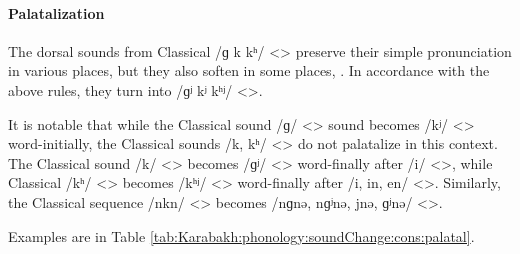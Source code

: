 \paragraph{Palatalization} 

The dorsal sounds from Classical /ɡ k kʰ/ <> preserve their simple pronunciation in various places, but they also soften in some places, . In accordance with the above rules, they turn into /ɡʲ kʲ kʰʲ/ <>. 

It is notable that while the Classical sound /ɡ/ <> sound becomes /kʲ/ <> word-initially, the Classical sounds /k, kʰ/ <> do not palatalize in this context. The Classical sound /k/ <> becomes /ɡʲ/ <> word-finally after /i/ <>, while Classical /kʰ/ <> becomes /kʰʲ/ <> word-finally after /i, in, en/ <>. Similarly, the Classical sequence /nkn/ <> becomes /nɡnə, nɡʲnə, jnə, ɡʲnə/ <>. 



Examples are in Table \ref{tab:Karabakh:phonology:soundChange:cons:palatal}. 


